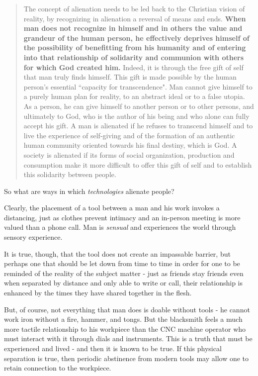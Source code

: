 \documentclass[letterpaper]{article}
\begin{document}
\begin{quote}
  The concept of alienation needs to be led back to the Christian vision of reality, by recognizing in alienation a reversal of means and ends. \textbf{When man does not recognize in himself and in others the value and grandeur of the human person, he effectively deprives himself of the possibility of benefitting from his humanity and of entering into that relationship of solidarity and communion with others for which God created him.} Indeed, it is through the free gift of self that man truly finds himself. This gift is made possible by the human person's essential ``capacity for transcendence". Man cannot give himself to a purely human plan for reality, to an abstract ideal or to a false utopia. As a person, he can give himself to another person or to other persons, and ultimately to God, who is the author of his being and who alone can fully accept his gift. A man is alienated if he refuses to transcend himself and to live the experience of self-giving and of the formation of an authentic human community oriented towards his final destiny, which is God. A society is alienated if its forms of social organization, production and consumption make it more difficult to offer this gift of self and to establish this solidarity between people.
\end{quote}

So what are ways in which \textit{technologies} alienate people?

Clearly, the placement of a tool between a man and his work invokes a distancing, just as clothes prevent intimacy and an in-person meeting is more valued than a phone call. Man is \textit{sensual} and experiences the world through sensory experience.

It is true, though, that the tool does not create an impassable barrier, but perhaps one that should be let down from time to time in order for one to be reminded of the reality of the subject matter - just as friends stay friends even when separated by distance and only able to write or call, their relationship is enhanced by the times they have shared together in the flesh.

But, of course, not everything that man does is doable without tools - he cannot work iron without a fire, hammer, and tongs. But the blacksmith feels a much more tactile relationship to his workpiece than the CNC machine operator who must interact with it through dials and instruments. This is a truth that must be experienced and lived - and then it is known to be true. If this physical separation is true, then periodic abstinence from modern tools may allow one to retain connection to the workpiece.
\end{document}
